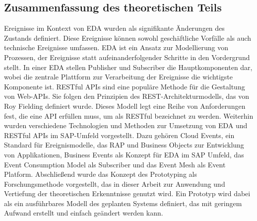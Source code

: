 \subsection{Zusammenfassung des theoretischen Teils}
Ereignisse im Kontext von \ac{EDA} wurden als signifikante Änderungen des Zustands definiert. Diese Ereignisse können sowohl geschäftliche Vorfälle als auch technische Ereignisse umfassen. \ac{EDA} ist ein Ansatz zur Modellierung von Prozessen, der Ereignisse statt aufeinanderfolgender Schritte in den Vordergrund stellt. In einer \ac{EDA} stellen Publisher und Subscriber die Hauptkomponenten dar, wobei die zentrale Plattform zur Verarbeitung der Ereignisse die wichtigste Komponente ist.
RESTful \ac{API}s sind eine populäre Methode für die Gestaltung von Web-\ac{API}s. Sie folgen den Prinzipien des \ac{REST}-Architekturmodells, das von Roy Fielding definiert wurde. Dieses Modell legt eine Reihe von Anforderungen fest, die eine \ac{API} erfüllen muss, um als RESTful bezeichnet zu werden.
Weiterhin wurden verschiedene Technologien und Methoden zur Umsetzung von \ac{EDA} und RESTful \ac{API}s im SAP-Umfeld vorgestellt. Dazu gehören Cloud Events, ein Standard für Ereignismodelle, das \ac{RAP} und Business Objects zur Entwicklung von Applikationen, Business Events als Konzept für \ac{EDA} im SAP Umfeld, das Event Consumption Model als Subscriber und das Event Mesh als Event Platform.
Abschließend wurde das Konzept des Prototyping als Forschungsmethode vorgestellt, das in dieser Arbeit zur Anwendung und Vertiefung der theoretischen Erkenntnisse genutzt wird. Ein Prototyp wird dabei als ein ausführbares Modell des geplanten Systems definiert, das mit geringem Aufwand erstellt und einfach geändert werden kann.